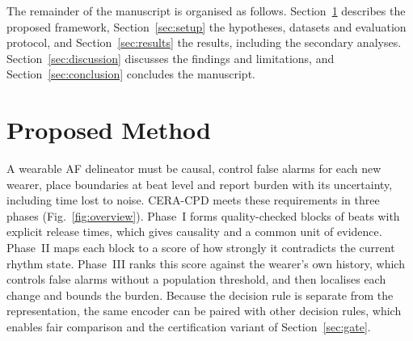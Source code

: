 \documentclass[preprint,12pt]{elsarticle}
\newcommand{\method}{CERA-CPD}
\newcommand{\1}{\mathbf{1}}
\begin{document}
The remainder of the manuscript is organised as follows. Section~\ref{sec:method} describes the proposed framework, Section~\ref{sec:setup} the hypotheses, datasets and evaluation protocol, and Section~\ref{sec:results} the results, including the secondary analyses. Section~\ref{sec:discussion} discusses the findings and limitations, and Section~\ref{sec:conclusion} concludes the manuscript.

\section{Proposed Method}
\label{sec:method}
A wearable AF delineator must be causal, control false alarms for each new wearer, place boundaries at beat level and report burden with its uncertainty, including time lost to noise. \method{} meets these requirements in three phases (Fig.~\ref{fig:overview}). Phase~I forms quality-checked blocks of beats with explicit release times, which gives causality and a common unit of evidence. Phase~II maps each block to a score of how strongly it contradicts the current rhythm state. Phase~III ranks this score against the wearer's own history, which controls false alarms without a population threshold, and then localises each change and bounds the burden. Because the decision rule is separate from the representation, the same encoder can be paired with other decision rules, which enables fair comparison and the certification variant of Section~\ref{sec:gate}.
\end{document}
